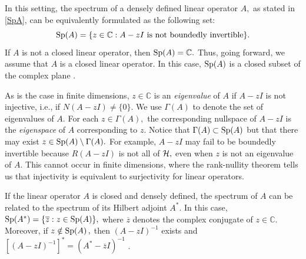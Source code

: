 


In this setting, the spectrum of a densely defined linear operator $A,$ as stated in \eqref{SpA}, can be equivalently formulated as the following set:
\begin{equation}\label{SpA2}
    \operatorname{Sp}\!\left(A\right) = \{z \in \mathbb{C} : A-zI \text{ is not boundedly invertible}\}.
\end{equation}
If $A$ is not a closed linear operator, then $\operatorname{Sp}\!\left(A\right) = \mathbb{C}.$ Thus, going forward, we assume that $A$ is a closed linear operator. In this case, $\operatorname{Sp}\!\left(A\right)$ is a closed subset of the complex plane \cite[Appendix A.3]{Matt}.  

As is the case in finite dimensions, $z \in \mathbb{C}$ is an \textit{eigenvalue} of $A$ if $A-zI$ is not injective, i.e., if $N(A-zI) \ne \{0\}.$ We use $\Gamma(A)$ to denote the set of eigenvalues of $A.$ For each $z \in \Gamma(A),$ the corresponding nullspace of $A-zI$ is the \textit{eigenspace} of $A$ corresponding to $z.$ Notice that $\Gamma(A) \subset \operatorname{Sp}\!\left(A\right)$ but that there may exist $z \in \operatorname{Sp}\!\left(A\right)\setminus \Gamma(A).$ For example, $A-zI$ may fail to be boundedly invertible because $R(A-zI)$ is not all of $\mathcal{H},$ even when $z$ is not an eigenvalue of $A.$ This cannot occur in finite dimensions, where the rank-nullity theorem tells us that injectivity is equivalent to surjectivity for linear operators.


If the linear operator $A$ is closed and densely defined, the spectrum of $A$ can be related to the spectrum of its Hilbert adjoint $A^*.$ In this case, $\operatorname{Sp}(A^*) = \{\overline{z} : z \in \operatorname{Sp}\!\left(A\right)\},$ where $\overline z$ denotes the complex conjugate of $z \in \mathbb{C}.$ Moreover, if $z \notin \operatorname{Sp}\!\left(A\right),$ then $(A-zI)^{-1}$ exists and $[(A-zI)^{-1}]^* = (A^* - \overline zI)^{-1}$ \cite[Appendix~A.3]{Matt}.  



